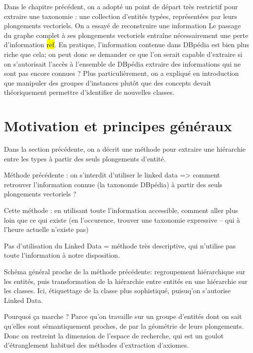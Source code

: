 \label{chap:texp}


Dans le chapitre précédent, on a adopté un point de départ très restrictif pour extraire une taxonomie : une collection d'entités typées, représentées par leurs plongements vectoriels. On a essayé de reconstruire une information
Le passage du graphe complet à ses plongements vectoriels entraîne nécessairement une perte d'information \hl{ref}.
En pratique, l'information contenue dans DBpédia est bien plus riche que cela; on peut donc se demander ce que l'on serait capable d'extraire si on s'autorisait l'accès à l'ensemble de DBpédia 
extraire des informations qui ne sont pas encore connues ?
Plus particulièrement, on a expliqué en introduction que manipuler des groupes d'instances plutôt que des concepts devait théoriquement permettre d'identifier de nouvelles classes. 

\section{Motivation et principes généraux}

Dans la section précédente, on a décrit une méthode pour extraire une hiérarchie entre les types à partir des seuls plongements d'entité. 

Méthode précédente : on s'interdit d'utiliser le linked data => comment retrouver l'information connue (la taxonomie DBpédia) à partir des seuls plongements vectoriels ?

Cette méthode : en utilisant toute l'information accessible, comment aller plus loin que ce qui existe (en l'occurence, trouver une taxonomie expressive – qui à l'heure actuelle n'existe pas)

Pas d'utilisation du Linked Data = méthode très descriptive, qui n'utilise pas toute l'information à notre disposition.

Schéma général proche de la méthode précédente: regroupement hiérarchique sur les entités, puis transformation de la hiérarchie entre entités en une hiérarchie sur les classes. Ici, étiquettage de la classe plus sophistiqué, puisuq'on s'autorise Linked Data.

Pourquoi ça marche ? Parce qu'on travaille sur un groupe d'entités dont on sait qu'elles sont sémantiquement proches, de par la géométrie de leurs plongements. Donc on restreint la dimension de l'espace de recherche, qui est un goulot d'étranglement habituel des méthodes d'extraction d'axiomes.

